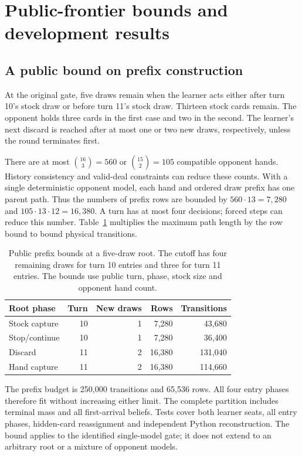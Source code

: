 \section{Public-frontier bounds and development results}
\label{app:frontier}
\subsection{A public bound on prefix construction}
At the original gate, five draws remain when the learner acts either after
turn 10's stock draw or before turn 11's stock draw. Thirteen stock cards remain.
The opponent holds three cards in the first case and two in the second.
The learner's next discard is reached after at most one or two new draws,
respectively, unless the round terminates first.

There are at most $\binom{16}{3}=560$ or $\binom{15}{2}=105$ compatible
opponent hands. History consistency and valid-deal constraints can reduce
these counts. With a single deterministic opponent model, each hand and
ordered draw prefix has one parent path. Thus the numbers of prefix rows
are bounded by $560\cdot13=7{,}280$ and
$105\cdot13\cdot12=16{,}380$. A turn has at most four decisions; forced
steps can reduce this number. Table~\ref{tab:frontier-bound} multiplies the
maximum path length by the row bound to bound physical transitions.

\begin{table}[htbp]
\centering\small
\begin{tabular}{lrrrr}
\toprule
Root phase & Turn & New draws & Rows & Transitions \\
\midrule
Stock capture & 10 & 1 & 7,280 & 43,680 \\
Stop/continue & 10 & 1 & 7,280 & 36,400 \\
Discard & 11 & 2 & 16,380 & 131,040 \\
Hand capture & 11 & 2 & 16,380 & 114,660 \\
\bottomrule
\end{tabular}
\caption{Public prefix bounds at a five-draw root. The cutoff has four
remaining draws for turn 10 entries and three for turn 11 entries. The bounds
use public turn, phase, stock size and opponent hand count.}
\label{tab:frontier-bound}
\end{table}

The prefix budget is 250,000 transitions and 65,536 rows. All four entry phases
therefore fit without increasing either limit. The complete partition includes
terminal mass and all first-arrival beliefs. Tests cover both learner seats,
all entry phases, hidden-card reassignment and independent Python reconstruction.
The bound applies to the identified single-model gate; it does not extend to
an arbitrary root or a mixture of opponent models.

